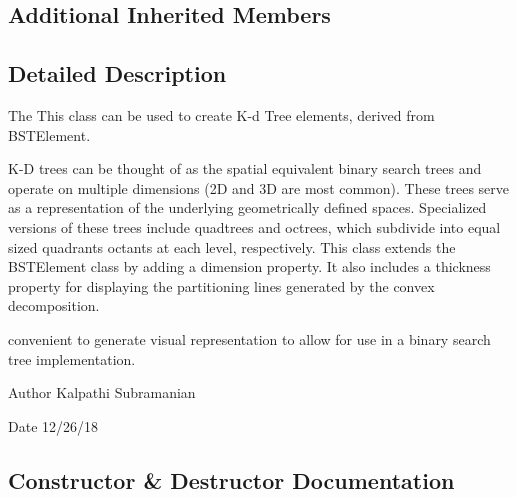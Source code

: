 \subsection*{Additional Inherited Members}


\subsection{Detailed Description}
The This class can be used to create K-\/d Tree elements, derived from B\+S\+T\+Element. 

K-\/\+D trees can be thought of as the spatial equivalent binary search trees and operate on multiple dimensions (2\+D and 3\+D are most common). These trees serve as a representation of the underlying geometrically defined spaces. Specialized versions of these trees include quadtrees and octrees, which subdivide into equal sized quadrants octants at each level, respectively. This class extends the B\+S\+T\+Element class by adding a dimension property. It also includes a thickness property for displaying the partitioning lines generated by the convex decomposition.

convenient to generate visual representation to allow for use in a binary search tree implementation.

\begin{DoxyAuthor}{Author}
Kalpathi Subramanian 
\end{DoxyAuthor}
\begin{DoxyDate}{Date}
12/26/18 
\end{DoxyDate}


\subsection{Constructor \& Destructor Documentation}
\hypertarget{classbridges_1_1kd__tree__element_1_1_k_d_tree_element_a46ef0064cc8185acdd02546d234dc97a}{}
